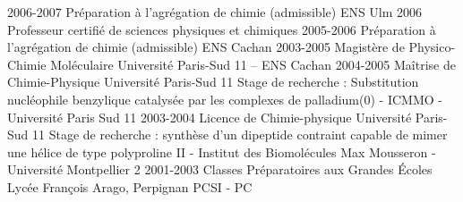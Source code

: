 \documentclass{cv-style-cec}
\begin{document}
\begin{entrylist}
\entry
{2006-2007}
{Préparation à l'agrégation de chimie (admissible)}
{ENS Ulm}
{\vspace{-3mm}}
\entry
{2006}
{Professeur certifié de sciences physiques et chimiques}
{}
{\vspace{-3mm}}
\entry
{2005-2006}
{Préparation à l'agrégation de chimie (admissible)}
{ENS Cachan}
{\vspace{-3mm}}
\entry
{2003-2005}
{Magistère de Physico-Chimie Moléculaire}
{Université Paris-Sud 11 -- ENS Cachan}
{\vspace{-3mm}}
\entry
{2004-2005}
{Maîtrise de Chimie-Physique}
{Université Paris-Sud 11}
{\small Stage de recherche : Substitution nucléophile benzylique                      
catalysée par les complexes de palladium(0) - ICMMO - Université Paris Sud 11}
\entry
{2003-2004}
{Licence de Chimie-physique}
{Université Paris-Sud 11}
{\small Stage de recherche : synthèse d'un dipeptide contraint capable de mimer une hélice de type polyproline II - 
Institut des Biomolécules Max Mousseron - Université Montpellier 2}
\entry
{2001-2003}
{Classes Préparatoires aux Grandes Écoles}
{Lycée François Arago, Perpignan}
{PCSI - PC}
\end{entrylist}

%
\end{document}
